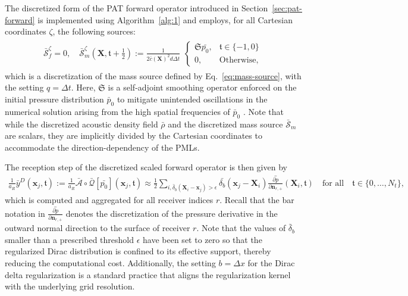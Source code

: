 \documentclass[11pt,reqno]{amsart}
\theoremstyle{remark}
\newcommand{\bx}{\boldsymbol{x}}
\newcommand{\bn}{\boldsymbol{n}}
\newcommand{\bX}{\boldsymbol{X}}
\newcommand{\bt}{\mathfrak{t}}
\begin{document}
The discretized form of the PAT forward operator introduced in Section~\ref{sec:pat-forward} is implemented using Algorithm~\ref{alg:1} and employs, for all Cartesian coordinates \( \zeta \), the following sources:
\begin{align}
\bar{\mathcal{S}}_f^{\zeta} =0, \quad \bar{\mathcal{S}}_m^\zeta \left(\bX, \bt+\frac{1}{2} \right):=\frac{1}{2 \bar{c}(\bX)^2 d \Delta t}
\begin{split}
\begin{cases}
\mathfrak{S}\bar{p_0},  & \mathfrak{t} \in \{-1,0\} \\
0, & \text{Otherwise},
\end{cases}
\end{split}
\end{align}
which is a discretization of the mass source defined by Eq.~\eqref{eq:mass-source}, with the setting \(q = \Delta t\). Here, \( \mathfrak{S} \) is a self-adjoint smoothing operator enforced on the initial pressure distribution \( \bar{p}_0 \) to mitigate unintended oscillations in the numerical solution arising from the high spatial frequencies of  \( \bar{p}_0 \) \cite{Arridge2016}. Note that while the discretized acoustic density field $\bar{\rho}$ and the discretized mass source $\bar{\mathcal{S}}_m$ are scalars, they are implicitly divided by the Cartesian coordinates to accommodate the direction-dependency of the PMLs.

The reception step of the discretized scaled forward operator is then given by
 \begin{align}  \label{eq:forward-reception-dis}
\frac{1}{a_R} \bar{y}^D\left(\bx_j, \mathfrak{t}\right) := \frac{1}{a_R} \bar{\mathcal{A}} \circ \bar{\mathcal{Q}} [\bar{p_0}] (\bx_j, \mathfrak{t} ) \approx \frac{1}{2} \sum_{i,\bar{\delta}_b(\bX_i- \bx_j) > \epsilon} \bar{\delta_b}\left( \bx_j -\bX_i  \right) \bar{\frac{\partial p}{\partial \bn_{r,+}}} \left( \bX_i , \bt \right)    \quad \text{for all} \quad  \bt \in \{0, \ldots, N_t\},
\end{align} 
which is computed and aggregated for all receiver indices \(r\). Recall that the bar notation in \( \bar{\frac{\partial p}{\partial \bn_{r,+}}} \) denotes the discretization of the pressure derivative in the outward normal direction to the surface of receiver \(r\). Note that the values of \(\bar{\delta}_b\) smaller than a prescribed threshold \(\epsilon\) have been set to zero so that the regularized Dirac distribution is confined to its effective support, thereby reducing the computational cost. Additionally, the setting \(b = \Delta x\) for the Dirac delta regularization is a standard practice that aligns the regularization kernel with the underlying grid resolution.
\end{document}
